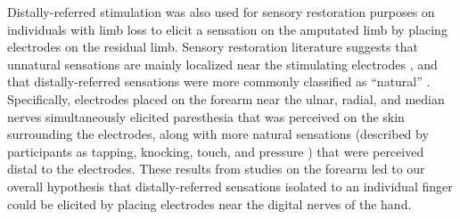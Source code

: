 \documentclass[10pt]{iopart}
\begin{document}
Distally-referred stimulation was also used for sensory restoration purposes on individuals with limb loss to elicit a sensation on the amputated limb by placing electrodes on the residual limb. Sensory restoration literature suggests that unnatural sensations are mainly localized near the stimulating electrodes \citeauthor{pena_channel-hopping_2021}, and that distally-referred sensations were more commonly classified as ``natural'' \cite{slopsema_natural_2018, pena_channel-hopping_2021}. Specifically, electrodes placed on the forearm near the ulnar, radial, and median nerves simultaneously elicited paresthesia that was perceived on the skin surrounding the electrodes, along with more natural sensations (described by participants as tapping, knocking, touch, and pressure \cite{dalonzo_electro-cutaneous_2018, slopsema_natural_2018}) that were perceived distal to the electrodes\cite{dalonzo_hyve_2014,geng_evaluation_2012}. These results from studies on the forearm led to our overall hypothesis that distally-referred sensations isolated to an individual finger could be elicited by placing electrodes near the digital nerves of the hand. 
\end{document}
